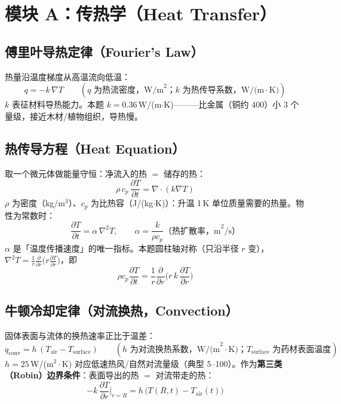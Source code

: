 \documentclass[12pt,a4paper]{ctexart}
\begin{document}
\section{模块 A：传热学（Heat Transfer）}

\subsection{傅里叶导热定律（Fourier's Law）}
热量沿温度梯度从高温流向低温：
\begin{equation}
q=-k\,\nabla T \qquad (q\text{ 为热流密度，W/m}^2\text{；}k\text{ 为热传导系数，W/(m}\cdot\text{K)})
\end{equation}
$k$ 表征材料导热能力。本题 $k=0.36$\,W/(m$\cdot$K)———比金属（铜约 400）小 3 个量级，接近木材/植物组织，导热慢。

\subsection{热传导方程（Heat Equation）}
取一个微元体做能量守恒：净流入的热 $=$ 储存的热：
\begin{equation}
\rho\,c_p\,\frac{\partial T}{\partial t}=\nabla\cdot(k\nabla T)
\end{equation}
$\rho$ 为密度（kg/m$^3$）、$c_p$ 为比热容（J/(kg$\cdot$K)）：升温 1\,K 单位质量需要的热量。物性为常数时：
\begin{equation}
\frac{\partial T}{\partial t}=\alpha\,\nabla^2 T,\qquad \alpha=\frac{k}{\rho c_p}\text{（热扩散率，m}^2\text{/s）}
\end{equation}
$\alpha$ 是「温度传播速度」的唯一指标。本题圆柱轴对称（只沿半径 $r$ 变），$\nabla^2 T=\frac{1}{r}\frac{\partial}{\partial r}\big(r\frac{\partial T}{\partial r}\big)$，即
\begin{equation}
\rho c_p\frac{\partial T}{\partial t}=\frac{1}{r}\frac{\partial}{\partial r}\Big(r\,k\,\frac{\partial T}{\partial r}\Big)
\end{equation}

\subsection{牛顿冷却定律（对流换热，Convection）}
固体表面与流体的换热速率正比于温差：
\begin{equation}
q_{\mathrm{conv}}=h\,(T_{\mathrm{air}}-T_{\mathrm{surface}}) \qquad (h\text{ 为对流换热系数，W/(m}^2\cdot\text{K)；}T_{\mathrm{surface}}\text{ 为药材表面温度})
\end{equation}
$h=25$\,W/(m$^2\cdot$K) 对应低速热风/自然对流量级（典型 5--100）。作为\textbf{第三类（Robin）边界条件}：表面导出的热 $=$ 对流带走的热：
\begin{equation}
-k\,\frac{\partial T}{\partial r}\bigg|_{r=R}=h\,\big(T(R,t)-T_{\mathrm{air}}(t)\big)
\end{equation}
\end{document}
